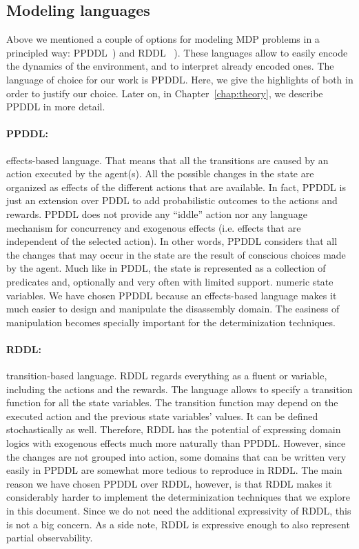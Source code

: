 \documentclass[../root.tex]{subfiles}
\begin{document}
\subsection{Modeling languages}

Above we mentioned a couple of options for modeling MDP
problems in a principled way: PPDDL~\cite{younes2004ppddl1}) and RDDL%
~\cite{sanner2010relational}). These languages allow to easily encode
the dynamics of the environment, and to interpret already encoded
ones. The language of choice for
our work is PPDDL. Here, we give the highlights of both in order
to justify our choice.
Later on, in Chapter~\ref{chap:theory}, we describe PPDDL in more detail.

\paragraph{PPDDL:} effects-based language. That means that
all the transitions are caused by an action executed by the agent(s). All
the possible changes in the state are organized as effects
of the different actions that are available. In fact, PPDDL is just an extension
over PDDL to add probabilistic outcomes to the actions and rewards. PPDDL does not provide any ``iddle'' action nor any language mechanism
for concurrency and exogenous effects (i.e.
effects that are independent of the selected action).
In other words, PPDDL considers that all the changes that may occur in the
state are the result of conscious choices made by the agent.
Much like in PDDL, the state is represented as a collection
of predicates and, optionally and very often with limited support. numeric
state variables. We have chosen PPDDL because an effects-based language
makes it much easier to design and
manipulate the disassembly domain.
The easiness of manipulation becomes specially important for
the determinization techniques.

\paragraph{RDDL:} transition-based language. RDDL regards everything as a
fluent or variable, including the actions and the rewards. The language allows
to specify a transition function for all the state variables. The transition
function may depend on the executed action and the previous state variables'
values. It can be defined stochastically as well. Therefore, RDDL has
the potential of expressing domain logics
with exogenous effects much more naturally than PPDDL. However, since the
changes are not grouped into action, some domains that can be written very
easily in PPDDL are somewhat more tedious to reproduce in RDDL. The main
reason we have chosen PPDDL over RDDL, however, is that RDDL makes it
considerably harder to implement the determinization techniques that we
explore in this document. Since we do not need the additional expressivity
of RDDL, this is not a big concern. As a side note, RDDL is expressive
enough to also represent partial observability.
\end{document}
